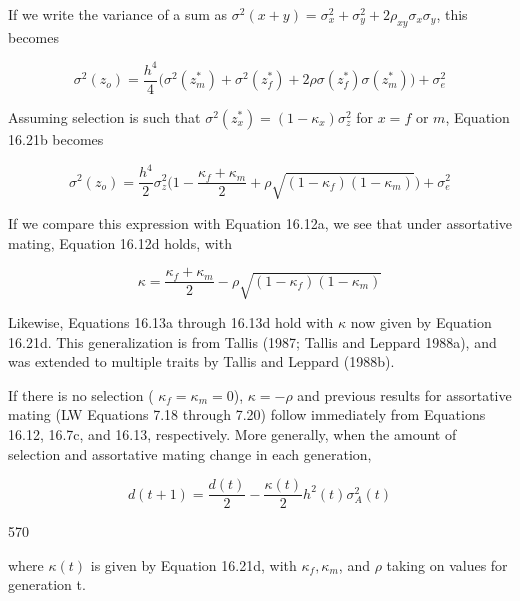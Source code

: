 \documentclass{article}
\begin{document}
If we write the variance of a sum as  $ \sigma^{2}(x+y)=\sigma_{x}^{2}+\sigma_{y}^{2}+2\rho_{xy}\sigma_{x}\sigma_{y} $, this becomes

\begin{equation}
\sigma^{2}(z_{o})=\frac{h^{4}}{4}\Biggl(\sigma^{2}(z_{m}^{*})+\sigma^{2}(z_{f}^{*})+2\rho\sigma(z_{f}^{*})\sigma(z_{m}^{*})\Biggr)+\sigma_{e}^{2}
\tag{16.21b}
\label{eq:16_21b}
\end{equation}

Assuming selection is such that  $ \sigma^2(z_x^*) = (1 - \kappa_x)\sigma_z^2 $ for  $ x = f $ or  $ m $, Equation 16.21b becomes

\begin{equation}
\sigma^{2}(z_{o})=\frac{h^{4}}{2}\sigma_{z}^{2}\Biggl(1-\frac{\kappa_{f}+\kappa_{m}}{2}+\rho\sqrt{\left(1-\kappa_{f}\right)\left(1-\kappa_{m}\right)}\Biggr)+\sigma_{e}^{2}
\tag{16.21c}
\label{eq:16_21c}
\end{equation}

If we compare this expression with Equation 16.12a, we see that under assortative mating, Equation 16.12d holds, with

\begin{equation}
\kappa=\frac{\kappa_{f}+\kappa_{m}}{2}-\rho\sqrt{\left(1-\kappa_{f}\right)\left(1-\kappa_{m}\right)}
\tag{16.21d}
\label{eq:16_21d}
\end{equation}

Likewise, Equations 16.13a through 16.13d hold with  $ \kappa $ now given by Equation 16.21d. This generalization is from Tallis (1987; Tallis and Leppard 1988a), and was extended to multiple traits by Tallis and Leppard (1988b).

If there is no selection ( $ \kappa_f = \kappa_m = 0 $),  $ \kappa = -\rho $ and previous results for assortative mating (LW Equations 7.18 through 7.20) follow immediately from Equations 16.12, 16.7c, and 16.13, respectively. More generally, when the amount of selection and assortative mating change in each generation,

\begin{equation}
d(t+1)=\frac{d(t)}{2}-\frac{\kappa(t)}{2}h^{2}(t)\sigma_{A}^{2}(t)
\tag{16.22}
\label{eq:16_22}
\end{equation}

570

where  $ \kappa(t) $ is given by Equation 16.21d, with  $ \kappa_{f}, \kappa_{m} $, and  $ \rho $ taking on values for generation t.
\end{document}
